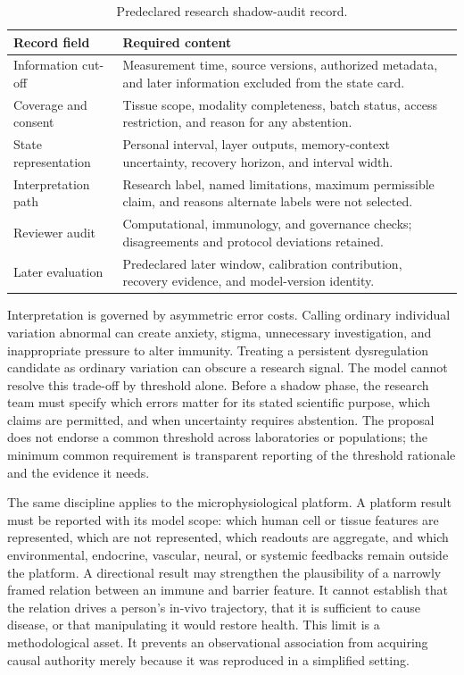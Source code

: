 \documentclass[conference]{IEEEtran}
\begin{document}
\begin{table}[t]
\caption{Predeclared research shadow-audit record.}
\label{tab:audit}
\centering
\renewcommand{\arraystretch}{1.12}
\begin{tabular}{|p{}|p{}|}
\hline
\textbf{Record field} & \textbf{Required content} \\
\hline
Information cut-off & Measurement time, source versions, authorized metadata, and later information excluded from the state card. \\
\hline
Coverage and consent & Tissue scope, modality completeness, batch status, access restriction, and reason for any abstention. \\
\hline
State representation & Personal interval, layer outputs, memory-context uncertainty, recovery horizon, and interval width. \\
\hline
Interpretation path & Research label, named limitations, maximum permissible claim, and reasons alternate labels were not selected. \\
\hline
Reviewer audit & Computational, immunology, and governance checks; disagreements and protocol deviations retained. \\
\hline
Later evaluation & Predeclared later window, calibration contribution, recovery evidence, and model-version identity. \\
\hline
\end{tabular}
\end{table}

Interpretation is governed by asymmetric error costs. Calling ordinary individual variation abnormal can create anxiety, stigma, unnecessary investigation, and inappropriate pressure to alter immunity. Treating a persistent dysregulation candidate as ordinary variation can obscure a research signal. The model cannot resolve this trade-off by threshold alone. Before a shadow phase, the research team must specify which errors matter for its stated scientific purpose, which claims are permitted, and when uncertainty requires abstention. The proposal does not endorse a common threshold across laboratories or populations; the minimum common requirement is transparent reporting of the threshold rationale and the evidence it needs.

The same discipline applies to the microphysiological platform. A platform result must be reported with its model scope: which human cell or tissue features are represented, which are not represented, which readouts are aggregate, and which environmental, endocrine, vascular, neural, or systemic feedbacks remain outside the platform. A directional result may strengthen the plausibility of a narrowly framed relation between an immune and barrier feature. It cannot establish that the relation drives a person's in-vivo trajectory, that it is sufficient to cause disease, or that manipulating it would restore health. This limit is a methodological asset. It prevents an observational association from acquiring causal authority merely because it was reproduced in a simplified setting.
\end{document}
